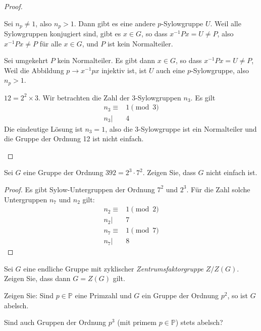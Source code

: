 \begin{proof}
	\begin{parts}
	\item Sei $n_p\neq 1$, also $n_p>1$. Dann gibt es eine andere $p$-Sylowgruppe $U$. Weil alle Sylowgruppen konjugiert sind, gibt es $x\in G$, so dass $x^{-1}Px=U\neq P$, also $x^{-1}Px\neq P$ f\"{u}r alle $x\in G$, und $P$ ist kein Normalteiler.

		Sei umgekehrt $P$ kein Normalteiler. Es gibt dann $x\in G$, so dass $x^{-1}Px=U\neq P$, Weil die Abbildung $p\to x^{-1}px$ injektiv ist, ist $U$ auch eine $p$-Sylowgruppe, also $n_p>1$.
	\item $12=2^2\times 3$. Wir betrachten die Zahl der $3$-Sylowgruppen $n_3$. Es gilt
		\begin{align*}
			n_3\equiv& 1\pmod{3}\\
			n_3|&4
		\end{align*}
		Die eindeutige Lösung ist $n_3=1$, also die $3$-Sylowgruppe ist ein Normalteiler und die Gruppe der Ordnung 12 ist nicht einfach.
	\end{parts}
\end{proof}
\begin{Problem}
	Sei $G$ eine Gruppe der Ordnung $392=2^3\cdot 7^2$. Zeigen Sie, dass $G$ nicht einfach ist.
\end{Problem}
\begin{proof}
	Es gibt Sylow-Untergruppen der Ordnung $7^2$ und $2^3$. F\"{u}r die Zahl solche Untergruppen $n_7$ und $n_2$ gilt:
	\begin{align*}
		n_2\equiv& 1\pmod{2}\\
		n_2|&7\\
		n_7\equiv& 1\pmod{7}\\
		n_7|&8
	\end{align*}
\end{proof}
\begin{Problem}
	\begin{parts}
	\item Sei $G$ eine endliche Gruppe mit zyklischer \emph{Zentrumsfaktorgruppe} $Z / Z(G)$. Zeigen Sie, dass dann $G=Z(G)$ gilt.
	\item Zeigen Sie: Sind $p\in \mathbb{P}$ eine Primzahl und $G$ ein Gruppe der Ordnung $p^2$, so ist $G$ abelsch.
	\item Sind auch Gruppen der Ordnung $p^3$ (mit primem $p\in \mathbb{P}$) stets abelsch?
	\end{parts}
\end{Problem}
